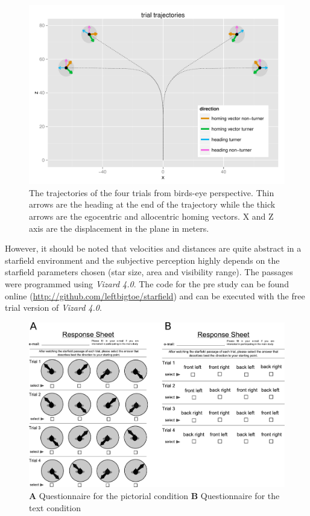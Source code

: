 \documentclass{frontiersSCNS} %
\begin{document}
\begin{figure}[h!]
  \centering
    \includegraphics[width=\textwidth]{figures/trajectories.pdf}
   \caption{ \footnotesize The trajectories of the four trials from birds-eye perspective. Thin arrows are the heading at the end of the trajectory while the thick arrows are the egocentric and allocentric homing vectors. X and Z axis are the displacement in the plane in meters.}
   \label{fig:trajectories}
\end{figure}

However, it should be noted that velocities and distances are quite abstract in a starfield environment and the subjective perception highly depends on the starfield parameters chosen (star size, area and visibility range). The passages were programmed using \textit{Vizard 4.0}. The code for the pre study can be found online (\url{http://github.com/leftbigtoe/starfield}) and can be executed with the free trial version of \textit{Vizard 4.0}.

\begin{figure}[h!]
  \centering
    \includegraphics[width=\textwidth]{figures/QuestAnswers.pdf}
   \caption{\textbf{A} Questionnaire for the pictorial condition \textbf{B} Questionnaire for the text condition}
   \label{fig:navQuest}
\end{figure}
\end{document}
